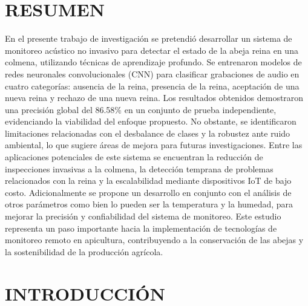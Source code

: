 \documentclass[12pt]{report}
\begin{document}
\pagebreak
\chapter*{RESUMEN}

En el presente trabajo de investigación se pretendió desarrollar un sistema de monitoreo acústico no invasivo para detectar el estado de la abeja reina en una colmena, utilizando técnicas de aprendizaje profundo. Se entrenaron modelos de redes neuronales convolucionales (CNN) para clasificar grabaciones de audio en cuatro categorías: ausencia de la reina, presencia de la reina, aceptación de una nueva reina y rechazo de una nueva reina. Los resultados obtenidos demostraron una precisión global del 86.58\% en un conjunto de prueba independiente, evidenciando la viabilidad del enfoque propuesto. No obstante, se identificaron limitaciones relacionadas con el desbalance de clases y la robustez ante ruido ambiental, lo que sugiere áreas de mejora para futuras investigaciones. Entre las aplicaciones potenciales de este sistema se encuentran la reducción de inspecciones invasivas a la colmena, la detección temprana de problemas relacionados con la reina y la escalabilidad mediante dispositivos IoT de bajo costo. Adicionalmente se propone un desarrollo en conjunto con el análisis de otros parámetros como bien lo pueden ser la temperatura y la humedad, para mejorar la precisión y confiabilidad del sistema de monitoreo. Este estudio representa un paso importante hacia la implementación de tecnologías de monitoreo remoto en apicultura, contribuyendo a la conservación de las abejas y la sostenibilidad de la producción agrícola.

\pagebreak
\chapter{INTRODUCCIÓN}
\vspace{-3em}
\end{document}
